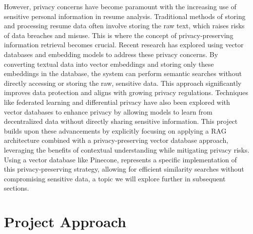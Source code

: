 \documentclass[12pt]{report}
\begin{document}
However, privacy concerns have become paramount with the increasing use of sensitive personal information in resume analysis. Traditional methods of storing and processing resume data often involve storing the raw text, which raises risks of data breaches and misuse. This is where the concept of privacy-preserving information retrieval becomes crucial. Recent research has explored using vector databases and embedding models to address these privacy concerns. \parencite{he-2025} By converting textual data into vector embeddings and storing only these embeddings in the database, the system can perform semantic searches without directly accessing or storing the raw, sensitive data. This approach significantly improves data protection and aligns with growing privacy regulations. \parencite{boppana-no-date} Techniques like federated learning and differential privacy have also been explored with vector databases to enhance privacy by allowing models to learn from decentralized data without directly sharing sensitive information. This project builds upon these advancements by explicitly focusing on applying a RAG architecture combined with a privacy-preserving vector database approach, leveraging the benefits of contextual understanding while mitigating privacy risks. Using a vector database like Pinecone, represents a specific implementation of this privacy-preserving strategy, allowing for efficient similarity searches without compromising sensitive data, a topic we will explore further in subsequent sections.


\section{Project Approach}
\end{document}
